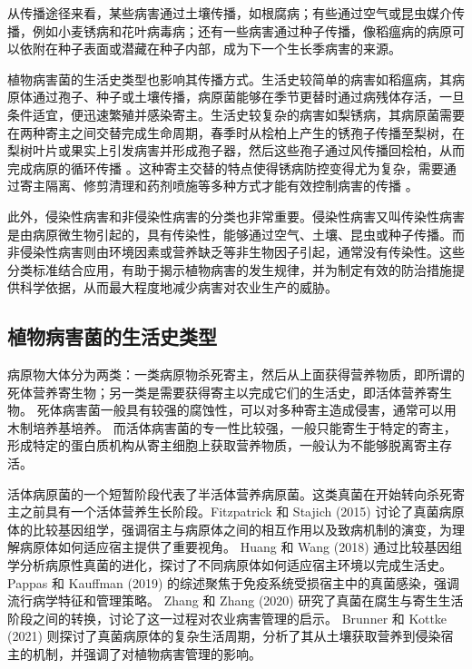 \documentclass[AutoFakeBold]{LZUThesis-PgD&PhD}
\begin{document}
	从传播途径来看，某些病害通过土壤传播，如根腐病；有些通过空气或昆虫媒介传播，例如小麦锈病和花叶病毒病；还有一些病害通过种子传播，像稻瘟病的病原可以依附在种子表面或潜藏在种子内部，成为下一个生长季病害的来源\cite{zeigler1996rice,kamoun2005late}。
	
	植物病害菌的生活史类型也影响其传播方式。生活史较简单的病害如稻瘟病，其病原体通过孢子、种子或土壤传播，病原菌能够在季节更替时通过病残体存活，一旦条件适宜，便迅速繁殖并感染寄主\cite{qiu2010,zeigler1996rice}。生活史较复杂的病害如梨锈病，其病原菌需要在两种寄主之间交替完成生命周期，春季时从桧柏上产生的锈孢子传播至梨树，在梨树叶片或果实上引发病害并形成孢子器，然后这些孢子通过风传播回桧柏，从而完成病原的循环传播 \cite{yu2018,jacquemart2015life}。这种寄主交替的特点使得锈病防控变得尤为复杂，需要通过寄主隔离、修剪清理和药剂喷施等多种方式才能有效控制病害的传播 \cite{palmieri2022}。

	此外，侵染性病害和非侵染性病害的分类也非常重要。侵染性病害又叫传染性病害是由病原微生物引起的，具有传染性，能够通过空气、土壤、昆虫或种子传播。而非侵染性病害则由环境因素或营养缺乏等非生物因子引起，通常没有传染性。这些分类标准结合应用，有助于揭示植物病害的发生规律，并为制定有效的防治措施提供科学依据，从而最大程度地减少病害对农业生产的威胁。
	
	\subsection{植物病害菌的生活史类型}
	
	病原物大体分为两类：一类病原物杀死寄主，然后从上面获得营养物质，即所谓的死体营养寄生物；另一类是需要获得寄主以完成它们的生活史，即活体营养寄生物。
	死体病害菌一般具有较强的腐蚀性，可以对多种寄主造成侵害，通常可以用木制培养基培养。
	而活体病害菌的专一性比较强，一般只能寄生于特定的寄主，形成特定的蛋白质机构从寄主细胞上获取营养物质，一般认为不能够脱离寄主存活。
	
	活体病原菌的一个短暂阶段代表了半活体营养病原菌。这类真菌在开始转向杀死寄主之前具有一个活体营养生长阶段。Fitzpatrick 和 Stajich (2015) 讨论了真菌病原体的比较基因组学，强调宿主与病原体之间的相互作用以及致病机制的演变，为理解病原体如何适应宿主提供了重要视角\cite{fitzpatrick2015comparative}。
	Huang 和 Wang (2018) 通过比较基因组学分析病原性真菌的进化，探讨了不同病原体如何适应宿主环境以完成生活史\cite{huang2018evolution}。Pappas 和 Kauffman (2019) 的综述聚焦于免疫系统受损宿主中的真菌感染，强调流行病学特征和管理策略\cite{pappas2019fungal}。
	Zhang 和 Zhang (2020) 研究了真菌在腐生与寄生生活阶段之间的转换，讨论了这一过程对农业病害管理的启示\cite{zhang2020fungi}。
	Brunner 和 Kottke (2021) 则探讨了真菌病原体的复杂生活周期，分析了其从土壤获取营养到侵染宿主的机制，并强调了对植物病害管理的影响\cite{brunner2021complex}。
	
\end{document}
